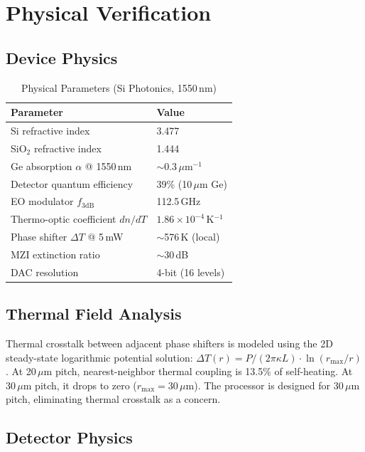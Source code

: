 \documentclass[conference]{IEEEtran}
\begin{document}
\section{Physical Verification}

\subsection{Device Physics}

\begin{table}[t]
\centering
\caption{Physical Parameters (Si Photonics, 1550\,nm)}
\label{tab:phys}
\begin{tabular}{@{}ll@{}}
\toprule
Parameter & Value \\
\midrule
Si refractive index & 3.477 \\
SiO$_2$ refractive index & 1.444 \\
Ge absorption $\alpha$ @ 1550\,nm & $\sim$0.3\,$\mu$m$^{-1}$ \\
Detector quantum efficiency & 39\% (10\,$\mu$m Ge) \\
EO modulator $f_{3\text{dB}}$ & 112.5\,GHz \\
Thermo-optic coefficient $dn/dT$ & $1.86\times10^{-4}$\,K$^{-1}$ \\
Phase shifter $\Delta T$ @ 5\,mW & $\sim$576\,K (local) \\
MZI extinction ratio & $\sim$30\,dB \\
DAC resolution & 4-bit (16 levels) \\
\bottomrule
\end{tabular}
\end{table}

\subsection{Thermal Field Analysis}

Thermal crosstalk between adjacent phase shifters is modeled using
the 2D steady-state logarithmic potential solution:
$\Delta T(r) = P/(2\pi\kappa L)\cdot\ln(r_{\text{max}}/r)$.
At 20\,$\mu$m pitch, nearest-neighbor thermal coupling is 13.5\%
of self-heating. At 30\,$\mu$m pitch, it drops to zero
($r_{\text{max}}=30\,\mu$m). The processor is designed for 30\,$\mu$m
pitch, eliminating thermal crosstalk as a concern.

\subsection{Detector Physics}
\end{document}
